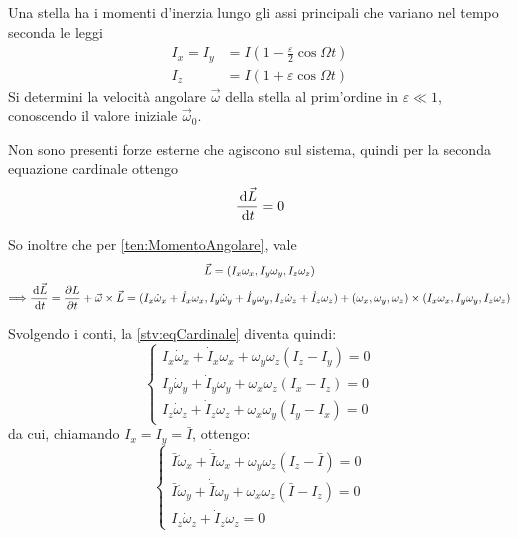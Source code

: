 \documentclass[../main.tex]{subfiles}
\begin{document}
\textex
Una stella ha i momenti d'inerzia lungo gli assi principali che variano nel tempo seconda le leggi
\begin{align*}
	I_x=I_y & =I\left(1-\frac \varepsilon 2\cos\Omega t\right)\\
	I_z & = I\left(1+\varepsilon \cos\Omega t\right)
\end{align*}
Si determini la velocità angolare $\vec\omega$ della stella al prim'ordine in $\varepsilon\ll 1$, conoscendo il valore iniziale $\vec\omega_0$.

\solution
Non sono presenti forze esterne che agiscono sul sistema, quindi per la seconda equazione cardinale ottengo
\begin{equation}\label{stv:eqCardinale}
	\frac{\,\mathrm{d} \vec L}{\,\mathrm{d} t}=0
\end{equation}

So inoltre che per \cref{ten:MomentoAngolare}, vale
\begin{gather*}
	\vec L = (I_x\omega_x,I_y\omega_y,I_z\omega_z)\\
	\Longrightarrow \frac{\,\mathrm{d} \vec L}{\,\mathrm{d} t}=\frac{\partial L}{\partial t}+\vec\omega\times \vec L = (I_x\dot\omega_x+\dot I_x\omega_x,I_y\dot \omega_y+\dot I_y\omega_y,I_z\dot\omega_z+\dot I_z\omega_z)+(\omega_x,\omega_y,\omega_z)\times (I_x\omega_x,I_y\omega_y,I_z\omega_z)
\end{gather*}

Svolgendo i conti, la \cref{stv:eqCardinale} diventa quindi:
\begin{equation*}
\begin{cases}
	I_x\dot\omega_x+\dot I_x\omega_x+\omega_y\omega_z(I_z-I_y)=0\\
	I_y\dot\omega_y+\dot I_y\omega_y+\omega_x\omega_z(I_x-I_z)=0\\
	I_z\dot\omega_z+\dot I_z\omega_z+\omega_x\omega_y(I_y-I_x)=0
\end{cases}
\end{equation*}
da cui, chiamando $I_x=I_y=\bar I$, ottengo:
\begin{equation}\label{stv:sistemaEq}
\begin{cases}
	\bar I\dot\omega_x+\dot {\bar I}\omega_x+\omega_y\omega_z(I_z-\bar I)=0\\
	\bar I\dot\omega_y+\dot {\bar I} \omega_y+\omega_x\omega_z(\bar I-I_z)=0\\
	I_z\dot\omega_z+\dot I_z\omega_z=0
\end{cases}
\end{equation}
\end{document}
